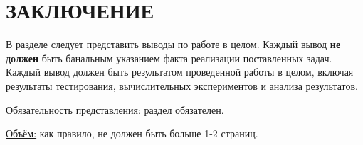 \chapter*{ЗАКЛЮЧЕНИЕ}\label{chap_conclusion}

В разделе следует представить выводы по работе в целом. Каждый вывод \textbf{не должен} быть банальным указанием факта реализации поставленных задач. Каждый вывод должен быть результатом проведенной работы в целом, включая результаты тестирования, вычислительных экспериментов и анализа результатов.

\underline{Обязательность представления:} раздел обязателен. 

\underline{Объём:} как правило, не должен быть больше 1-2 страниц.

